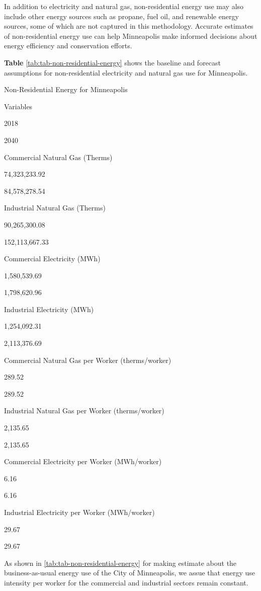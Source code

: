 \documentclass[
]{book}
\begin{document}
In addition to electricity and natural gas, non-residential energy use may also include other energy sources such as propane, fuel oil, and renewable energy sources, some of which are not captured in this methodology. Accurate estimates of non-residential energy use can help Minneapolis make informed decisions about energy efficiency and conservation efforts.

\textbf{Table} \ref{tab:tab-non-residential-energy} shows the baseline and forecast assumptions for non-residential electricity and natural gas use for Minneapolis.

\label{tab:tab-non-residential-energy}Non-Residential Energy for Minneapolis

Variables

2018

2040

Commercial Natural Gas (Therms)

74,323,233.92

84,578,278.54

Industrial Natural Gas (Therms)

90,265,300.08

152,113,667.33

Commercial Electricity (MWh)

1,580,539.69

1,798,620.96

Industrial Electricity (MWh)

1,254,092.31

2,113,376.69

Commercial Natural Gas per Worker (therms/worker)

289.52

289.52

Industrial Natural Gas per Worker (therms/worker)

2,135.65

2,135.65

Commercial Electricity per Worker (MWh/worker)

6.16

6.16

Industrial Electricity per Worker (MWh/worker)

29.67

29.67

As shown in \ref{tab:tab-non-residential-energy} for making estimate about the business-as-usual energy use of the City of Minneapolis, we assue that energy use intensity per worker for the commercial and industrial sectors remain constant.
\end{document}
